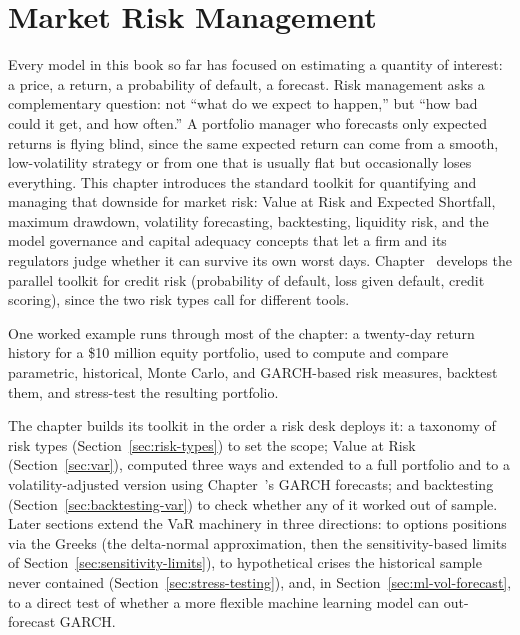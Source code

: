 \documentclass[../ai_in_finance]{subfiles}
\begin{document}
\chapter{Market Risk Management}

Every model in this book so far has focused on estimating a quantity of interest: a price, a return, a probability of default, a forecast. Risk management asks a complementary question: not ``what do we expect to happen,'' but ``how bad could it get, and how often.'' A portfolio manager who forecasts only expected returns is flying blind, since the same expected return can come from a smooth, low-volatility strategy or from one that is usually flat but occasionally loses everything.
This chapter introduces the standard toolkit for quantifying and managing that downside for market risk: Value at Risk and Expected Shortfall, maximum drawdown, volatility forecasting, backtesting, liquidity risk, and the model governance and capital adequacy concepts that let a firm and its regulators judge whether it can survive its own worst days.
Chapter~ develops the parallel toolkit for credit risk (probability of default, loss given default, credit scoring), since the two risk types call for different tools.

One worked example runs through most of the chapter: a twenty-day return history for a \$10 million equity portfolio, used to compute and compare parametric, historical, Monte Carlo, and GARCH-based risk measures, backtest them, and stress-test the resulting portfolio.

The chapter builds its toolkit in the order a risk desk deploys it: a taxonomy of risk types (Section~\ref{sec:risk-types}) to set the scope; Value at Risk (Section~\ref{sec:var}), computed three ways and extended to a full portfolio and to a volatility-adjusted version using Chapter~'s GARCH forecasts; and backtesting (Section~\ref{sec:backtesting-var}) to check whether any of it worked out of sample.
Later sections extend the VaR machinery in three directions: to options positions via the Greeks (the delta-normal approximation, then the sensitivity-based limits of Section~\ref{sec:sensitivity-limits}), to hypothetical crises the historical sample never contained (Section~\ref{sec:stress-testing}), and, in Section~\ref{sec:ml-vol-forecast}, to a direct test of whether a more flexible machine learning model can out-forecast GARCH.
\end{document}
